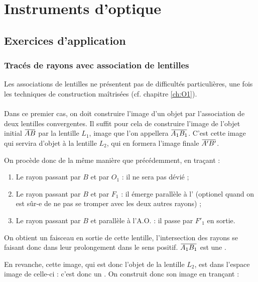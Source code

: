 \documentclass[10pt,a5paper,notitlepage]{book}
\begin{document}
\chapter{Instruments d'optique}
\vspace*{-24pt}
\section{Exercices d'application}
\subsection{Tracés de rayons avec association de lentilles}
Les associations de lentilles ne présentent pas de difficultés particulières,
une fois les techniques de construction maîtrisées (cf. chapitre \ref{ch:O1}).

\subsubsection{}
Dans ce premier cas, on doit construire l'image d'un objet  par
l'association de deux lentilles convergentes. Il suffit pour cela de construire
l'image de l'objet initial $\ABb$ par la lentille $L_1$, image que l'on appellera
$\ABa$. C'est cette image qui servira d'objet à la lentille $L_2$, qui en
formera l'image finale $\ABp$. \bigbreak

On procède donc de la même manière que précédemment, en traçant :
\begin{enumerate}
    \item Le rayon passant par $B$ et par $O_1$ : il ne sera pas dévié ;
    \item Le rayon passant par $B$ et par $F_1$ : il émerge parallèle à
        l' (optionel quand on est sûr-e de ne pas se
        tromper avec les deux autres rayons) ;
    \item Le rayon passant par $B$ et parallèle à l'A.O. : il passe par $F'_1$
        en sortie.
\end{enumerate}

On obtient un faisceau  en sortie de cette lentille,
l'intersection des rayons se faisant donc dans leur prolongement dans le sens
positif. $\ABa$ est une  . \bigbreak

En revanche, cette image, qui est donc l'objet de la lentille $L_2$, est dans
l'espace image de celle-ci : c'est donc un  . On construit donc son image en trançant :
\end{document}
